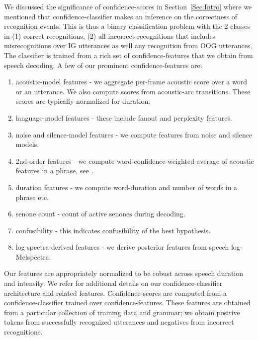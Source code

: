 We discussed the significance of confidence-scores in Section~\ref{Sec:Intro} where we mentioned that confidence-classifier makes an inference on the correctness of recognition events. This is thus a binary classification problem \cite{Bishop} with the 2-classes in (1) correct recognitions, (2) all incorrect recognitions that includes misrecognitions over IG utterances as well any recognition from OOG utterances. The classifier is trained from a rich set of confidence-features that we obtain from speech decoding.
A few of our prominent confidence-features are:
\begin{enumerate}
  \item acoustic-model features - we aggregate per-frame acoustic score over a word or an utterance. We also compute scores from acoustic-arc transitions. These scores are typically normalized for duration.
  \item language-model features - these include fanout and perplexity features.
  \item noise and silence-model features - we compute features from noise and silence models.
  \item 2nd-order features - we compute word-confidence-weighted average of acoustic features in a phrase, see \cite{Posen1}.
  \item duration features - we compute word-duration and number of words in a phrase etc.
  \item senone count - count of active senones during decoding.
  \item confusibility - this indicates confusibility of the best hypothesis.
  \item log-spectra-derived features - we derive posterior features from speech log-Melspectra.
\end{enumerate}
Our features are appropriately normalized to be robust across speech duration and intensity. We refer \cite{Posen1} for additional details on our confidence-classifier architecture and related features.  Confidence-scores are computed from a confidence-classifier trained over confidence-features. These features are obtained from a particular collection of training data and grammar; we obtain positive tokens from successfully recognized utterances and negatives from incorrect recognitions. 


